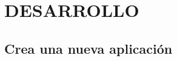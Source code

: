 \documentclass[12pt,letterpaper]{article}
\begin{document}
    \section{DESARROLLO}
    \subsection{Crea una nueva aplicación}
\end{document}
